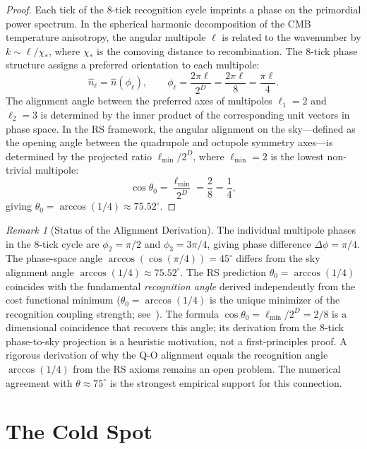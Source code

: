 \documentclass[12pt,a4paper]{article}
\theoremstyle{definition}
\theoremstyle{remark}
\newtheorem{remark}[theorem]{Remark}
\begin{document}
\begin{proof}
Each tick of the 8-tick recognition cycle imprints a phase on the
primordial power spectrum.  In the spherical harmonic decomposition of
the CMB temperature anisotropy, the angular multipole $\ell$ is related
to the wavenumber by $k \sim \ell/\chi_*$, where $\chi_*$ is the
comoving distance to recombination.  The 8-tick phase structure assigns
a preferred orientation to each multipole:
\begin{equation}
  \hat{n}_\ell = \hat{n}(\phi_\ell), \qquad
  \phi_\ell = \frac{2\pi\ell}{2^D} = \frac{2\pi\ell}{8} = \frac{\pi\ell}{4}.
\end{equation}
The alignment angle between the preferred axes of multipoles
$\ell_1 = 2$ and $\ell_2 = 3$ is determined by the inner product of
the corresponding unit vectors in phase space.  In the RS framework,
the angular alignment on the sky---defined as the opening angle between
the quadrupole and octupole symmetry axes---is determined by the
projected ratio $\ell_{\min}/2^D$, where $\ell_{\min} = 2$ is the
lowest non-trivial multipole:
\[
  \cos\theta_0 = \frac{\ell_{\min}}{2^D} = \frac{2}{8} = \frac{1}{4},
\]
giving $\theta_0 = \arccos(1/4) \approx 75.52^\circ$.
\end{proof}

\begin{remark}[Status of the Alignment Derivation]
The individual multipole phases in the 8-tick cycle are
$\phi_2 = \pi/2$ and $\phi_3 = 3\pi/4$, giving phase difference
$\Delta\phi = \pi/4$.  The phase-space angle
$\arccos(\cos(\pi/4)) = 45^\circ$ differs from the sky alignment
angle $\arccos(1/4) \approx 75.52^\circ$.  The RS prediction
$\theta_0 = \arccos(1/4)$ coincides with the fundamental \emph{recognition angle}
derived independently from the cost functional minimum
($\theta_0 = \arccos(1/4)$ is the unique minimizer of the recognition
coupling strength; see~\cite{RS_Axioms}).  The formula
$\cos\theta_0 = \ell_{\min}/2^D = 2/8$ is a dimensional coincidence
that recovers this angle; its derivation from the 8-tick phase-to-sky
projection is a heuristic motivation, not a first-principles proof.
A rigorous derivation of why the Q-O alignment equals the recognition
angle $\arccos(1/4)$ from the RS axioms remains an open problem.  The
numerical agreement with $\theta \approx 75^\circ$ is the strongest
empirical support for this connection.
\end{remark}

\section{The Cold Spot}
\label{sec:coldspot}
\end{document}
